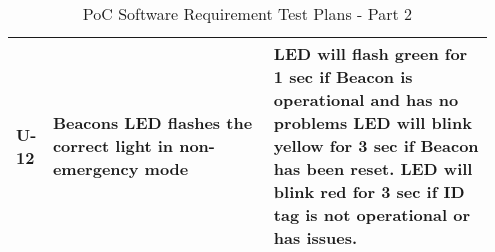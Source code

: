 \begin{table}[h!]
\begin{tabular}{|m{0.05\linewidth}|m{0.45\linewidth}|m{0.45\linewidth}|}
    U-12
    & Beacons LED flashes the correct light in non-emergency mode
    & LED will flash green for 1 sec if Beacon is operational and has no problems
      LED will blink yellow for 3 sec if Beacon has been reset.
      LED will blink red for 3 sec if ID tag is not operational or has issues.  \\ 
    \hline

\end{tabular}
    \caption{PoC Software Requirement Test Plans - Part 2}
\end{table}

